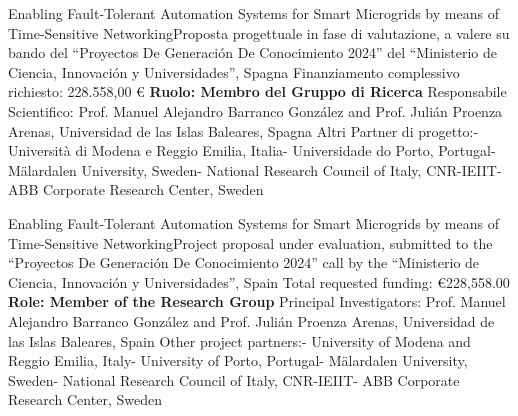 {Enabling Fault-Tolerant Automation Systems for Smart Microgrids by means of Time-Sensitive Networking}{\newline Proposta progettuale in fase di valutazione, a valere su bando del ``Proyectos De Generación De Conocimiento 2024'' del ``Ministerio de Ciencia, Innovación y Universidades'', Spagna}
{\newline
	Finanziamento complessivo richiesto: 228.558,00 €\newline
	\textbf{Ruolo: Membro del Gruppo di Ricerca}\newline
    Responsabile Scientifico: Prof. Manuel Alejandro Barranco González and Prof. Julián Proenza Arenas,  Universidad de las Islas Baleares, Spagna\newline
	Altri Partner di progetto:\newline{}- Università di Modena e Reggio Emilia, Italia\newline{}- Universidade do Porto, Portugal\newline{}- Mälardalen University, Sweden\newline{}- National Research Council of Italy, CNR-IEIIT\newline{}- ABB Corporate Research Center, Sweden}{}


    {Enabling Fault-Tolerant Automation Systems for Smart Microgrids by means of Time-Sensitive Networking}{\newline Project proposal under evaluation, submitted to the ``Proyectos De Generación De Conocimiento 2024'' call by the ``Ministerio de Ciencia, Innovación y Universidades'', Spain}
    {\newline
        Total requested funding: €228,558.00\newline
        \textbf{Role: Member of the Research Group}\newline
        Principal Investigators: Prof. Manuel Alejandro Barranco González and Prof. Julián Proenza Arenas, Universidad de las Islas Baleares, Spain\newline
        Other project partners:\newline{}- University of Modena and Reggio Emilia, Italy\newline{}- University of Porto, Portugal\newline{}- Mälardalen University, Sweden\newline{}- National Research Council of Italy, CNR-IEIIT\newline{}- ABB Corporate Research Center, Sweden}{}
    


